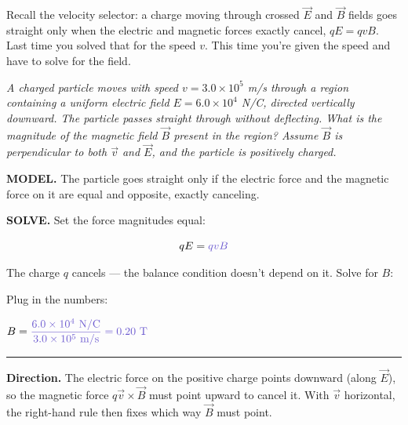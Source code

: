\documentclass[12pt]{article}
\newcommand{\eqline}[2][-0.5mm]{%
  \par\vspace{1mm}\noindent #2\par\vspace{#1}%
  \noindent\textcolor{rulehue}{\rule{\linewidth}{0.5pt}}\par\vspace{4mm}%
}
\newcommand{\ANS}[1]{\textcolor{accent}{#1}}
\begin{document}



Recall the velocity selector: a charge moving through crossed
$\vec E$ and $\vec B$ fields goes straight only when the electric and
magnetic forces exactly cancel, $qE=qvB$. Last time you solved that
for the speed $v$. This time you're given the speed and have to solve
for the field.

\textit{A charged particle moves with speed $v=3.0\times10^5$ m/s
through a region containing a uniform electric field
$E=6.0\times10^4$ N/C, directed vertically downward. The particle
passes straight through without deflecting. What is the magnitude of
the magnetic field $\vec B$ present in the region? Assume $\vec B$ is
perpendicular to both $\vec v$ and $\vec E$, and the particle is
positively charged.}

\textbf{MODEL.} The particle goes straight only if the electric force
and the magnetic force on it are \ANS{equal and opposite}, exactly
canceling.

\textbf{SOLVE.} Set the force magnitudes equal:

\[
qE = \ANS{qvB}
\]

The charge $q$ \ANS{cancels} --- the balance condition doesn't depend
on it. Solve for $B$:

\result[1.6cm]{$B = \ANS{\dfrac{E}{v}}$}

Plug in the numbers:

\eqline[0.2cm]{$B = \ANS{\dfrac{6.0\times10^4\text{ N/C}}{3.0\times10^5
\text{ m/s}} = 0.20\text{ T}}$}

\textbf{Direction.} The electric force on the positive charge points
downward (along $\vec E$), so the magnetic force $q\vec v\times\vec B$
must point \ANS{upward} to cancel it. With $\vec v$ horizontal, the
right-hand rule then fixes which way $\vec B$ must point.
\end{document}
